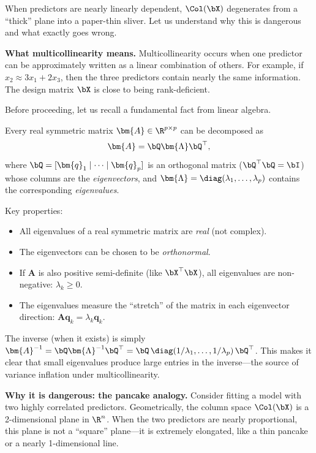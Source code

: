 When predictors are nearly linearly dependent, $\Col(\bX)$ degenerates
from a ``thick'' plane into a paper-thin sliver.
Let us understand why this is dangerous and what exactly goes wrong.

\medskip
\noindent\textbf{What multicollinearity means.}
Multicollinearity occurs when one predictor can be approximately written as a linear combination of others.
For example, if $x_2 \approx 3x_1 + 2x_3$, then the three predictors contain nearly the same information.
The design matrix $\bX$ is close to being rank-deficient.

\medskip
\begin{remark}
Before proceeding, let us recall a fundamental fact from linear algebra.

Every real symmetric matrix $\bm{A} \in \R^{p \times p}$ can be
decomposed as
\[
  \bm{A} = \bQ \bm{\Lambda} \bQ^\top,
\]
where $\bQ = [\bm{q}_1 \mid \cdots \mid \bm{q}_p]$ is an orthogonal
matrix ($\bQ^\top \bQ = \bI$) whose columns are the \emph{eigenvectors},
and $\bm{\Lambda} = \diag(\lambda_1, \dots, \lambda_p)$ contains the
corresponding \emph{eigenvalues}.

Key properties:
\begin{itemize}[nosep]
  \item All eigenvalues of a real symmetric matrix are \emph{real}
        (not complex).
  \item The eigenvectors can be chosen to be \emph{orthonormal}.
  \item If $\bm{A}$ is also positive semi-definite (like $\bX^\top\bX$),
        all eigenvalues are non-negative: $\lambda_k \ge 0$.
  \item The eigenvalues measure the ``stretch'' of the matrix in each
        eigenvector direction: $\bm{A}\bm{q}_k = \lambda_k \bm{q}_k$.
\end{itemize}

The inverse (when it exists) is simply
$\bm{A}^{-1} = \bQ \bm{\Lambda}^{-1} \bQ^\top
= \bQ \, \diag(1/\lambda_1, \dots, 1/\lambda_p) \, \bQ^\top$.
This makes it clear that small eigenvalues produce large entries in the
inverse---the source of variance inflation under multicollinearity.
\end{remark}

\medskip
\noindent\textbf{Why it is dangerous: the pancake analogy.}
Consider fitting a model with two highly correlated predictors.
Geometrically, the column space $\Col(\bX)$ is a 2-dimensional plane in $\R^n$.
When the two predictors are nearly proportional, this plane is not a ``square'' plane---it is extremely elongated, like a thin pancake or a nearly 1-dimensional line.

